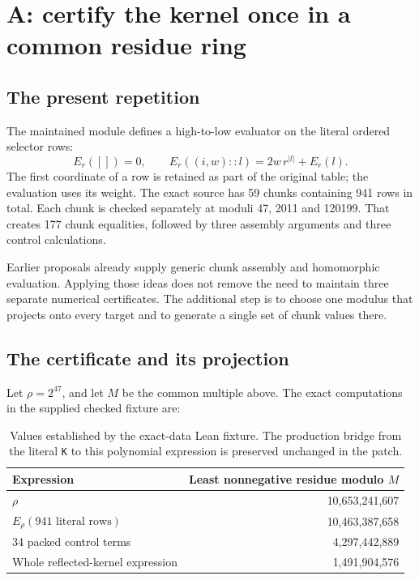 \documentclass[11pt,letterpaper]{article}
\newcommand{\code}[1]{\nolinkurl{#1}}
\begin{document}
\section{A: certify the kernel once in a common residue ring}

\subsection{The present repetition}

The maintained module defines a high-to-low evaluator on the literal ordered selector rows:
\[
 E_r([])=0,\qquad E_r((i,w)::l)=2w\,r^{|l|}+E_r(l).
\]
The first coordinate of a row is retained as part of the original table; the evaluation uses its weight. The exact source has 59 chunks containing 941 rows in total. Each chunk is checked separately at moduli 47, 2011 and 120199. That creates 177 chunk equalities, followed by three assembly arguments and three control calculations.

Earlier proposals already supply generic chunk assembly and homomorphic evaluation. Applying those ideas does not remove the need to maintain three separate numerical certificates. The additional step is to choose one modulus that projects onto every target and to generate a single set of chunk values there.

\subsection{The certificate and its projection}

Let \(\rho=2^{47}\), and let \(M\) be the common multiple above. The exact computations in the supplied checked fixture are:

\begin{table}[ht]
\centering
\begin{tabular}{@{}lr@{}}
\toprule
Expression & Least nonnegative residue modulo \(M\)\\
\midrule
\(\rho\) & 10,653,241,607\\
\(E_\rho(\text{941 literal rows})\) & 10,463,387,658\\
34 packed control terms & 4,297,442,889\\
Whole reflected-kernel expression & 1,491,904,576\\
\bottomrule
\end{tabular}
\caption{Values established by the exact-data Lean fixture. The production bridge from the literal \code{K} to this polynomial expression is preserved unchanged in the patch.}
\end{table}
\end{document}
